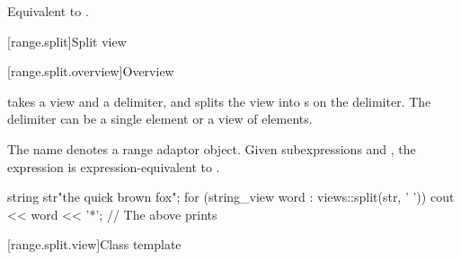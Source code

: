 \begin{itemdescr}
\pnum
\effects
Equivalent to
.
\end{itemdescr}

[range.split]{Split view}

[range.split.overview]{Overview}

\pnum
{} takes a view and a delimiter, and
splits the view into s on the delimiter.
The delimiter can be a single element or a view of elements.

\pnum
The name  denotes
a range adaptor object.
Given subexpressions  and ,
the expression  is expression-equivalent to
.

\pnum
\begin{example}
\begin{codeblock}
string str{"the quick brown fox"};
for (string_view word : views::split(str, ' ')) {
  cout << word << '*';
}
// The above prints 
\end{codeblock}
\end{example}

[range.split.view]{Class template }

